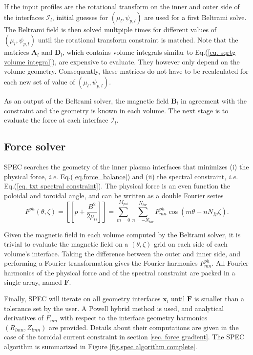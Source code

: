 \documentclass[my_thesis.tex]{subfiles}
\begin{document}
If the input profiles are the rotational transform on the inner and outer side of the interfaces $\mathcal{I}_l$, initial guesses for $(\mu_l,\psi_{p,l})$ are used for a first Beltrami solve. The Beltrami field is then solved multpiple times for different values of $(\mu_l,\psi_{p,l})$ until the rotational transform constraint is matched. Note that the matrices $\mathbf{A}_l$ and $\mathbf{D}_l$, which contains volume integrals similar to Eq.(\ref{eq. sqrtg volume integral}), are expensive to evaluate. They however only depend on the volume geometry. Consequently, these matrices do not have to be recalculated for each new set of value of $(\mu_l,\psi_{p,l})$.

As an output of the Beltrami solver, the magnetic field $\mathbf{B}_l$ in agreement with the constraint and the geometry is known in each volume. The next stage is to evaluate the force at each interface $\mathcal{I}_l$.



\subsection{Force solver}
SPEC searches the geometry of the inner plasma interfaces that minimizes (i) the physical force, \textit{i.e.} Eq.(\ref{eq.force_balance}) and (ii) the spectral constraint, \textit{i.e.} Eq.(\ref{eq. txt spectral constraint}). The physical force is an even function the poloidal and toroidal angle, and can be written as a double Fourier series 
\begin{equation}
	F^{ph}(\theta,\zeta) = \left[\left[ p + \frac{B^2}{2\mu_0}\right]\right] = \sum_{m=0}^{M_{pol}}\sum_{n=-N_{tor}}^{N_{tor}} F^{ph}_{mn}\cos(m\theta-nN_{fp}\zeta).
\end{equation}

Given the magnetic field in each volume computed by the Beltrami solver, it is trivial to evaluate the magnetic field on a $(\theta,\zeta)$ grid on each side of each volume's interface. Taking the difference between the outer and inner side, and performing a Fourier transformation gives the Fourier harmonics $F^{ph}_{mn}$. All Fourier harmonics of the physical force and of the spectral constraint are packed in a single array, named $\mathbf{F}$.

Finally, SPEC will iterate on all geometry interfaces $\mathbf{x}_l$ until $\mathbf{F}$ is smaller than a tolerance set by the user. A Powell hybrid method is used, and analytical derivatives of $F_{mn}$ with respect to the interface geometry harmonics $(R_{lmn}, Z_{lmn})$ are provided. Details about their computations are given in the case of the toroidal current constraint in section \ref{sec. force gradient}. The SPEC algorithm is summarized in Figure \ref{fig.spec algorithm complete}. 
\end{document}
